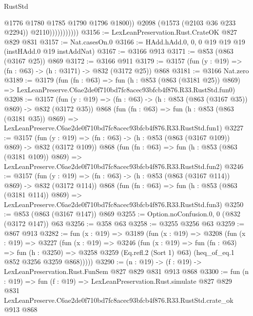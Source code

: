 \begin{lexlean}{RustStd}
\begin{coremodule}
                              @1776
                              @1780
                              @1785
                              @1790
                              @1796
                              @1800))
                          @2098
                          (@1573 (@2103 @36 @233 @2294))
                          @2110)))))))))))
@3156 := LexLeanPreservation.Rust.CrateOK @827 @829 @831
@3157 := Nat.casesOn.{0}
@3166 := HAdd.hAdd.{0, 0, 0} @19 @19 @19 (instHAdd.{0} @19 instAddNat)
@3167 := @3166 @913
@3171 := @853 (@863 (@3167 @25)) @869
@3172 := @3166 @911
@3179 := @3157 (fun (y : @19) => (fn : @63) -> (h : @3171) -> @832 (@3172 @25)) @868
@3181 := @3166 Nat.zero
@3189 := @3179
    (fun (fn : @63) =>
    fun (h : @853 (@863 (@3181 @25)) @869) =>
    LexLeanPreserve.C6ae2de0f710bd7fc8acec93bfcb4f876.R33.RustStd.fun0)
@3208 := @3157
    (fun (y : @19) => (fn : @63) -> (h : @853 (@863 (@3167 @35)) @869) -> @832 (@3172 @35))
    @868
    (fun (fn : @63) =>
    fun (h : @853 (@863 (@3181 @35)) @869) =>
    LexLeanPreserve.C6ae2de0f710bd7fc8acec93bfcb4f876.R33.RustStd.fun1)
@3227 := @3157
    (fun (y : @19) => (fn : @63) -> (h : @853 (@863 (@3167 @109)) @869) -> @832 (@3172 @109))
    @868
    (fun (fn : @63) =>
    fun (h : @853 (@863 (@3181 @109)) @869) =>
    LexLeanPreserve.C6ae2de0f710bd7fc8acec93bfcb4f876.R33.RustStd.fun2)
@3246 := @3157
    (fun (y : @19) => (fn : @63) -> (h : @853 (@863 (@3167 @114)) @869) -> @832 (@3172 @114))
    @868
    (fun (fn : @63) =>
    fun (h : @853 (@863 (@3181 @114)) @869) =>
    LexLeanPreserve.C6ae2de0f710bd7fc8acec93bfcb4f876.R33.RustStd.fun3)
@3250 := @853 (@863 (@3167 @147)) @869
@3255 := Option.noConfusion.{0, 0} (@832 (@3172 @147)) @63
@3256 := @358 @63
@3258 := @3255 @3256 @63
@3259 := @867 @913
@3282 := fun (x : @19) =>
  @3189
    (fun (x : @19) =>
    @3208
      (fun (x : @19) =>
      @3227
        (fun (x : @19) =>
        @3246
          (fun (x : @19) =>
          fun (fn : @63) =>
          fun (h : @3250) =>
          @3258 @3259 (Eq.refl.{2} (Sort 1) @63) (heq_of_eq.{1} @852 @3256 @3259 @868)))))
@3290 := (n : @19) -> (f : @19) -> LexLeanPreservation.Rust.FunSem @827 @829 @831 @913 @868
@3300 := fun (n : @19) =>
  fun (f : @19) =>
  LexLeanPreservation.Rust.simulate
    @827
    @829
    @831
    LexLeanPreserve.C6ae2de0f710bd7fc8acec93bfcb4f876.R33.RustStd.crate_ok
    @913
    @868
\end{coremodule}
\end{lexlean}
